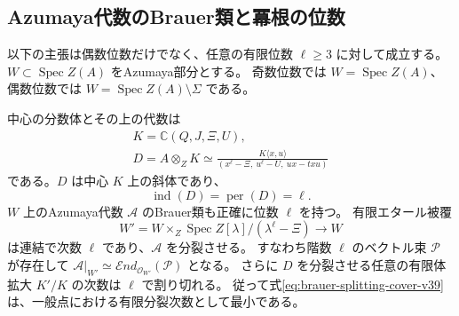 \subsection{Azumaya代数のBrauer類と冪根の位数}

以下の主張は偶数位数だけでなく、任意の有限位数 $\ell\ge3$ に対して成立する。
$W\subset\operatorname{Spec}Z(A)$ をAzumaya部分とする。
奇数位数では $W=\operatorname{Spec}Z(A)$、偶数位数では
$W=\operatorname{Spec}Z(A)\setminus\Sigma$ である。

\begin{theorem}[正確なBrauer周期と最小分裂次数]
\label{thm:brauer-period-v39}
中心の分数体とその上の代数は
\begin{equation}
\label{eq:generic-symbol-v39}
 \begin{gathered}
 K=\mathbb C(Q,J,\Xi,U),\\
 D=A\otimes_ZK
 \simeq
 \frac{K\langle x,u\rangle}
 {(x^\ell-\Xi,\ u^\ell-U,\ ux-txu)}
 \end{gathered}
\end{equation}
である。$D$ は中心 $K$ 上の斜体であり、
\[
 \operatorname{ind}(D)=\operatorname{per}(D)=\ell.
\]
$W$ 上のAzumaya代数 $\mathcal A$ のBrauer類も正確に位数 $\ell$ を持つ。
有限エタール被覆
\begin{equation}
\label{eq:brauer-splitting-cover-v39}
 W'=W\times_Z\operatorname{Spec}Z[\lambda]/(\lambda^\ell-\Xi)
 \longrightarrow W
\end{equation}
は連結で次数 $\ell$ であり、$\mathcal A$ を分裂させる。
すなわち階数 $\ell$ のベクトル束 $\mathcal P$ が存在して
$\mathcal A|_{W'}\simeq\mathcal End_{\mathcal O_{W'}}(\mathcal P)$ となる。
さらに $D$ を分裂させる任意の有限体拡大 $K'/K$ の次数は $\ell$ で割り切れる。
従って式\eqref{eq:brauer-splitting-cover-v39}は、一般点における有限分裂次数として最小である。
\end{theorem}

